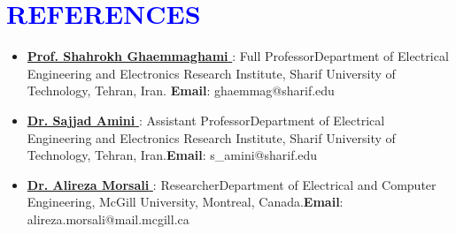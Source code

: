 \documentclass[letterpaper,11pt]{article}
\newcommand{\resumeSubHeadingListStart}{\begin{itemize}[leftmargin=0.0in, label={}]}
\begin{document}
\section{\Large{\textcolor{blue}{REFERENCES}}}
        \begin{itemize}[itemsep=-2pt, parsep=5pt]
            \item \href{http://sharif.edu/~ghaemmag/}{\textbf{Prof. Shahrokh Ghaemmaghami} {\raisebox{-0.1\height}\faExternalLink }}: Full Professor\newline Department of Electrical Engineering and Electronics Research Institute, Sharif University of Technology, Tehran, Iran. \newline \textbf{Email}: ghaemmag@sharif.edu 
            
            \item \href{https://scholar.google.com/citations?user=24GngZYAAAAJ&hl=en}{\textbf{Dr. Sajjad Amini} {\raisebox{-0.1\height}\faExternalLink }}: Assistant Professor\newline Department of Electrical Engineering and Electronics Research Institute, Sharif University of Technology, Tehran, Iran.\newline \textbf{Email}: s\_amini@sharif.edu
            
            
            \item \href{https://scholar.google.com/citations?user=y-RVrUkAAAAJ&hl=en}{\textbf{Dr. Alireza Morsali} {\raisebox{-0.1\height}\faExternalLink }}: Researcher\newline Department of Electrical and Computer Engineering, McGill University, Montreal, Canada.\newline \textbf{Email}:  alireza.morsali@mail.mcgill.ca
        \end{itemize}
 
\end{document}
